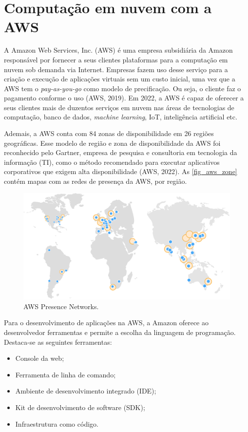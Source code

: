\section{Computação em nuvem com a AWS}
A Amazon Web Services, Inc. (AWS) é uma empresa subsidiária da Amazon responsável por fornecer a seus clientes plataformas para a computação em nuvem sob demanda via Internet. Empresas fazem uso desse serviço para a criação e execução de aplicações virtuais sem um custo inicial, uma vez que a AWS tem o \textit{pay-as-you-go} como modelo de precificação. Ou seja, o cliente faz o pagamento conforme o uso (AWS, 2019). Em 2022, a AWS é capaz de oferecer a seus clientes mais de duzentos serviços em nuvem nas áreas de tecnologias de computação, banco de dados, \textit{machine learning}, IoT, inteligência artificial etc.

Ademais, a AWS conta com 84 zonas de disponibilidade em 26 regiões geográficas. Esse modelo de região e zona de disponibilidade da AWS foi reconhecido pelo Gartner, empresa de pesquisa e consultoria em tecnologia da informação (TI), como o método recomendado para executar aplicativos corporativos que exigem alta disponibilidade (AWS, 2022). As \autoref{fig_aws_zone} contém mapas com as redes de presença da AWS, por região.

\begin{figure}[htb]
	\caption{AWS Presence Networks.}
	\begin{center}
		\includegraphics[scale=0.3]{Imagens/aws_zones.pdf}
	\end{center}
	\label{fig_aws_zone}
\end{figure}

Para o desenvolvimento de aplicações na AWS, a Amazon oferece ao desenvolvedor ferramentas e permite a escolha da linguagem de programação. Destaca-se as seguintes ferramentas:
\begin{itemize}
	\item Console da web;
	\item Ferramenta de linha de comando;
	\item Ambiente de desenvolvimento integrado (IDE);
	\item Kit de desenvolvimento de software (SDK);
	\item Infraestrutura como código.
\end{itemize}


